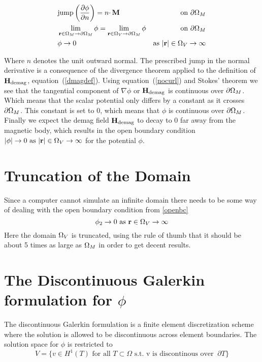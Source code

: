\documentclass[12pt,a4paper,notitlepage]{article}
\begin{document}
\begin{subequations}
\begin{align}
&\mbox{jump} \left( \frac{\partial \phi}{\partial n} \right) = n \cdotp \mathbf{M}  &\mbox{ on }  \partial \Omega_M \label{jumpbc} \\
&\lim_{\mathbf{r} \in \Omega_M \rightarrow \partial \Omega_M} \phi =  \lim_{\mathbf{r} \in \Omega_V \rightarrow \partial \Omega_M} 
\phi & \mbox{on } \partial \Omega_M \label{contbc} \\
&\phi \rightarrow 0 \ & \mbox{as} \ |\mathbf{r}| \in \Omega_V \rightarrow \infty \label{openbc}
\end{align}
\end{subequations}

\noindent Where $n$ denotes the unit outward normal. The prescribed jump in the normal derivative is a 
consequence of the divergence theorem applied to the definition of $\mathbf{H}_\mathrm{demag}$, equation~(\ref{dmagdef}).
Using equation~(\ref{nocurl}) and Stokes' theorem we see that the tangential component of $\nabla \phi$ or $\mathbf{H}_\mathrm{demag}$ is
continuous over $\partial \Omega_M$. Which means that the scalar potential only differs by a constant as it crosses $\partial \Omega_M$.
This constant is set to 0, which means that $\phi$ is continuous over $\partial \Omega_M$. Finally we expect the demag field $\mathbf{H}_\mathrm{demag}$ 
to decay to 0 far away from the magnetic body, which results in the open boundary condition
$| \phi | \rightarrow 0  \ \mbox{as} \ |\mathbf{r}| \in \Omega_V \rightarrow \infty$ for the potential $\phi$. 


\section{Truncation of the Domain}
Since a computer cannot simulate an infinite domain there needs to be some way of dealing with the open boundary condition from
\ref{openbc}
\[\phi_2 \rightarrow 0 \ \mbox{as} \ \mathbf{r} \in \Omega_V \rightarrow \infty \]
Here the domain $\Omega_V$ is truncated, using the rule of thumb that it should be about 5 times as large as $\Omega_M$ in order to get
decent results. 

\section{The Discontinuous Galerkin formulation for $\phi$}
The discontinuous Galerkin formulation is a finite element discretization scheme where the 
solution is allowed to be discontinuous across element boundaries. The solution space for 
$\phi$ is restricted to 
\[ V = \{ v \in H^1 (T) \mbox{ for all } T \subset \Omega \mbox{ s.t. v is discontinous over } 
\ \partial T \} \]
\end{document}
